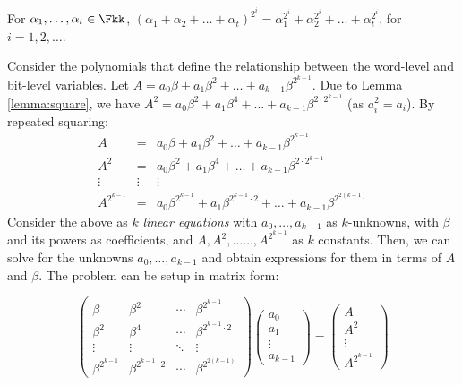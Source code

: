\begin{Lemma}
\label{lemma:square}
For $\alpha_1, \dots, \alpha_t \in \Fkk$, $(\alpha_1 + \alpha_2 +
\dots + \alpha_t)^{2^i} = \alpha_1^{2^i} + \alpha_2^{2^i} + \dots +
\alpha_t^{2^i}$, for $i = 1, 2, \ldots$. 
\end{Lemma}

Consider the polynomials that define the relationship between the
word-level and bit-level variables. Let 
$ A = a_0 \beta + a_1\beta^2 + \dots + a_{k-1}\beta^{2^{k-1}}$.
Due to Lemma \ref{lemma:square}, we have $A^2 = a_0 \beta^{2}+ a_1
\beta^{4} + \dots + a_{k-1} \beta^{2\cdot 2^{k-1}}$ (as
$a_i^2 = a_i$). By repeated squaring:
\begin{eqnarray}
A & = & a_0 \beta + a_1\beta^2 + \dots + a_{k-1}\beta^{2^{k-1}}\nonumber\\
A^2 & = & a_0 \beta^{2}+ a_1 \beta^{4} + \dots + a_{k-1}
\beta^{2\cdot 2^{k-1}} \nonumber\\
\vdots & \vdots& \vdots \nonumber\\
A^{2^{k-1}} & = & a_0 \beta^{2^{k-1}}  +  a_1 \beta^{2^{k-1}\cdot 2} +
\dots + a_{k-1}\beta^{2^{2(k-1)}} \nonumber
\end{eqnarray}
Consider the above as $k$ {\it linear equations} with $a_0, \dots, a_{k-1}$
as $k$-unknowns, with $\beta$ and its powers as coefficients, and 
$A, A^2, ... \dots, A^{2^{k-1}}$ as $k$ constants. Then, we can solve
for the unknowns $a_0, \dots, a_{k-1}$ and obtain expressions for them
in terms of $A$ and $\beta$. The problem can be setup in
matrix form:

\begin{displaymath}
\begin{pmatrix}
\beta & \beta^2 & \cdots & \beta^{2^{k-1}} \\
\beta^2 & \beta^4 & \cdots & \beta^{2^{k-1}\cdot 2} \\
\vdots & \vdots & \ddots & \vdots \\
\beta^{2^{k-1}} & \beta^{2^{k-1}\cdot 2} & \cdots & \beta^{2^{2(k-1)}}
\end{pmatrix}
\begin{pmatrix}
a_0\\
a_1\\
\vdots\\
a_{k-1}
\end{pmatrix}
=
\begin{pmatrix}
A\\
A^2\\
\vdots\\
A^{2^{k-1}}
\end{pmatrix}
\end{displaymath}

